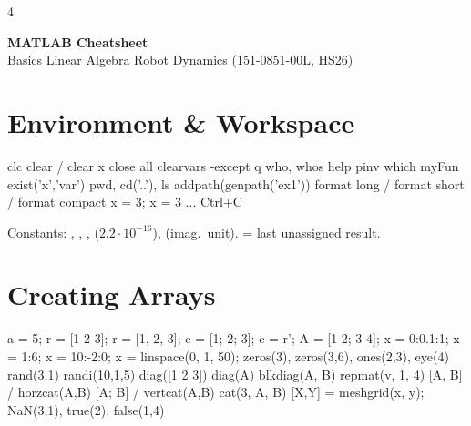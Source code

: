 \documentclass[8pt,landscape]{extarticle}
\newcommand{\mc}[1]{\texttt{\detokenize{#1}}}
\begin{document}
\scriptsize
\begin{multicols*}{4}

\begin{tcolorbox}[colback=ethblue,colframe=ethblue,coltext=white,arc=0pt,left=2pt,right=2pt,top=1pt,bottom=1pt]
{\bfseries\normalsize MATLAB Cheatsheet}\\
{\tiny Basics \textbullet{} Linear Algebra \textbullet{} Robot Dynamics (151-0851-00L, HS26)}
\end{tcolorbox}

\section{Environment \& Workspace}
\begin{ml}
clc                 %
clear / clear x     %
close all           %
clearvars -except q %
who, whos           %
help pinv           %
which myFun         %
exist('x','var')    %
pwd, cd('..'), ls   %
addpath(genpath('ex1'))   %
format long / format short / format compact
x = 3;              %
x = 3               %
...                 %
Ctrl+C              %
\end{ml}
\begin{tip}Constants: \mc{pi}, \mc{Inf}, \mc{NaN}, \mc{eps} ($2.2\cdot10^{-16}$), \mc{1i} (imag.\ unit). \mc{ans} = last unassigned result.\end{tip}

\section{Creating Arrays}
\begin{ml}
a = 5;                    %
r = [1 2 3];  r = [1, 2, 3];   %
c = [1; 2; 3];            %
c = r';                   %
A = [1 2; 3 4];           %
x = 0:0.1:1;              %
x = 1:6;                  %
x = 10:-2:0;              %
x = linspace(0, 1, 50);   %
zeros(3), zeros(3,6), ones(2,3), eye(4)
rand(3,1)   %
randi(10,1,5)             %
diag([1 2 3])             %
diag(A)                   %
blkdiag(A, B)             %
repmat(v, 1, 4)           %
[A, B]  / horzcat(A,B)    %
[A; B]  / vertcat(A,B)    %
cat(3, A, B)              %
[X,Y] = meshgrid(x, y);   %
NaN(3,1), true(2), false(1,4)
\end{ml}


\end{multicols*}
\end{document}
